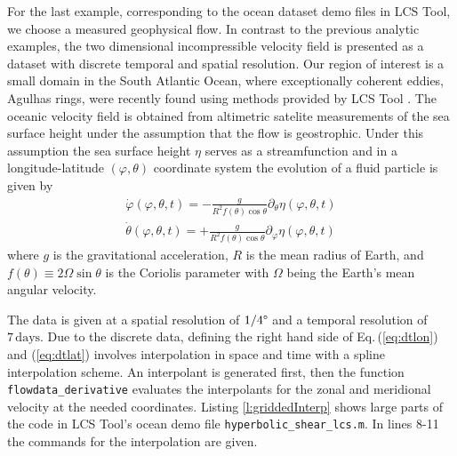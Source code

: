 \documentclass{article}
\begin{document}
For the last example, corresponding to the ocean dataset demo files in LCS Tool, we choose a measured geophysical flow. In contrast to the previous analytic examples, the two dimensional incompressible velocity field is presented as a dataset with discrete temporal and spatial resolution. Our region of interest is a small domain in the South Atlantic Ocean, where exceptionally coherent eddies, Agulhas rings, were recently found using methods provided by LCS Tool \parencite{haller13:_coher_lagran}. The oceanic velocity field is obtained from altimetric satelite measurements of the sea surface height under the assumption that the flow is geostrophic. Under this assumption the sea surface height $\eta$ serves as a streamfunction and in a longitude-latitude $(\varphi,\theta)$ coordinate system the evolution of a fluid particle is given by
\begin{eqnarray}
\dot{\varphi}(\varphi,\theta,t) = -\frac{g}{R^2 f(\theta) \cos\theta}\partial_{\theta}\eta(\varphi,\theta,t)\label{eq:dtlon}\\
\dot{\theta}(\varphi,\theta,t) = +\frac{g}{R^2 f(\theta) \cos\theta}\partial_{\varphi}\eta(\varphi,\theta,t)
\label{eq:dtlat}
\end{eqnarray}
where $g$ is the gravitational acceleration, $R$ is the mean radius of Earth, and $f(\theta) \equiv 2\Omega\sin\theta$ is the Coriolis parameter with $\Omega$ being the Earth's mean angular velocity. 

The data is given at a spatial resolution of $1/4\degree$ and a temporal resolution of $7\,\mathrm{days}$. Due to the discrete data, defining the right hand side of Eq.\,(\ref{eq:dtlon}) and (\ref{eq:dtlat}) involves interpolation in space and time with a spline interpolation scheme. An interpolant is generated first, then the function \lstinline!flowdata_derivative! evaluates the interpolants for the zonal and meridional velocity at the needed coordinates. Listing \ref{l:griddedInterp} shows large parts of the code in LCS Tool's ocean demo file \lstinline!hyperbolic_shear_lcs.m!. In lines 8-11 the commands for the interpolation are given.
\end{document}
